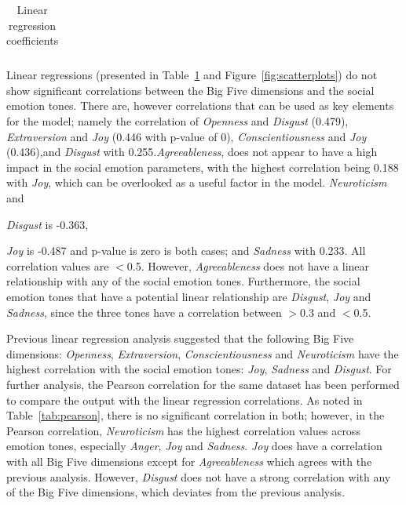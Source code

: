\documentclass[graybox]{svmult}
\begin{document}
{\begin{table}[!ht]
{\begin{tabular}{@{}llll|lll|lll|lll|lll@{}}
\bottomrule

\end{tabular}%
}
\caption{Linear regression coefficients}
\label{tbl:linreg}
\end{table}

Linear regressions (presented in Table~\ref{tbl:linreg} and
Figure~\ref{fig:scatterplots}) do not show significant correlations
between the Big Five dimensions and the social emotion tones. There
are, however correlations that can be used as key elements for the
model; namely the correlation of {\emph{Openness} and {\emph{Disgust}}
(0.479), {\emph{Extraversion}} and {\emph{Joy}} (0.446 with p-value of
0), {\emph{Conscientiousness}} and {\emph{Joy}} (0.436),and
\emph{Disgust}} with 0.255.{\emph{Agreeableness}}, does not appear to
have a high impact in the social emotion parameters, with the highest
correlation being 0.188 with {\emph{Joy}}, which can be overlooked as
a useful factor in the model. {\emph{Neuroticism}} and {\emph{Disgust}
is -0.363, {\emph{Joy} is -0.487 and p-value is zero is both cases;
and {\emph{Sadness}} with 0.233. All correlation values are
$<$0.5. However, {\emph{Agreeableness}} does not have a linear
relationship with any of the social emotion tones. Furthermore, the
social emotion tones that have a potential linear relationship are
{\emph{Disgust}}, {\emph{Joy}} and {\emph{Sadness}}, since the three
tones have a correlation between $>$0.3 and $<$0.5.

Previous linear regression analysis suggested that the following Big
Five dimensions: {\emph{Openness}}, {\emph{Extraversion}},
{\emph{Conscientiousness}} and {\emph{Neuroticism}} have the highest
correlation with the social emotion tones: {\emph{Joy}},
{\emph{Sadness}} and {\emph{Disgust}}. For further analysis, the
Pearson correlation for the same dataset has been performed to compare
the output with the linear regression correlations. As noted in
Table~\ref{tab:pearson}, there is no significant correlation in both;
however, in the Pearson correlation, {\emph{Neuroticism}} has the
highest correlation values across emotion tones, especially
{\emph{Anger}}, {\emph{Joy}} and {\emph{Sadness}}. {\emph{Joy}} does
have a correlation with all Big Five dimensions except for
{\emph{Agreeableness}} which agrees with the previous
analysis. However, {\emph{Disgust}} does not have a strong correlation
with any of the Big Five dimensions, which deviates from the previous
analysis.

}}}
\end{document}

